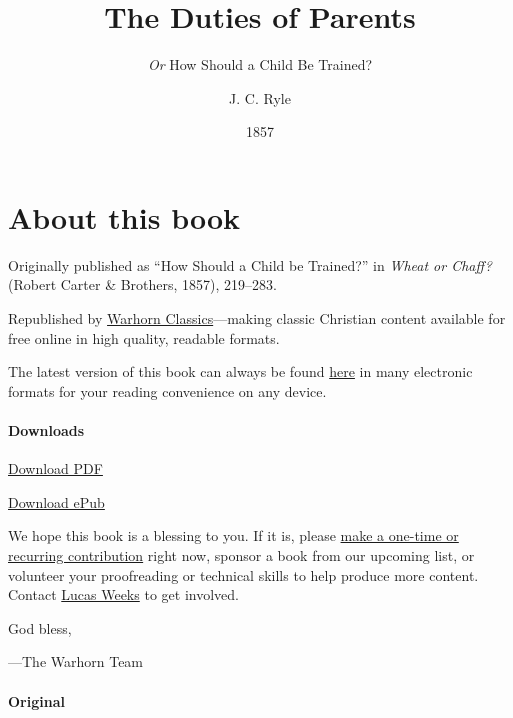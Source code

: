 \documentclass[
]{book}
\title{The Duties of Parents}
\subtitle{\emph{Or} How Should a Child Be Trained?}
\author{J. C. Ryle}
\date{1857}
\begin{document}
\maketitle

\mainmatter
{}

{
\setcounter{tocdepth}{2}
\tableofcontents
}
\hypertarget{about-this-book}{%
\chapter*{About this book}\label{about-this-book}}

Originally published as ``How Should a Child be Trained?'' in \emph{Wheat or Chaff?} (Robert Carter \& Brothers, 1857), 219--283.

Republished by \href{https://classics.warhornmedia.com/}{Warhorn Classics}---making classic Christian content available for free online in high quality, readable formats.

The latest version of this book can always be found \href{https://warhornmedia.github.io/ryle-duties-of-parents/}{here} in many electronic formats for your reading convenience on any device.

\hypertarget{downloads}{%
\subsubsection*{Downloads}\label{downloads}}

\href{https://warhornmedia.github.io/ryle-duties-of-parents//Ryle-Duties_of_Parents.pdf}{Download PDF}

\href{https://warhornmedia.github.io/ryle-duties-of-parents//Ryle-Duties_of_Parents.epub}{Download ePub}

We hope this book is a blessing to you. If it is, please \href{https://warhornmedia.com/give}{make a one-time or recurring contribution} right now, sponsor a book from our upcoming list, or volunteer your proofreading or technical skills to help produce more content. Contact \href{mailto:lucas@beggarsborn.com}{Lucas Weeks} to get involved.

God bless,

---The Warhorn Team

\hypertarget{original}{%
\subsubsection*{Original}\label{original}}
\end{document}
